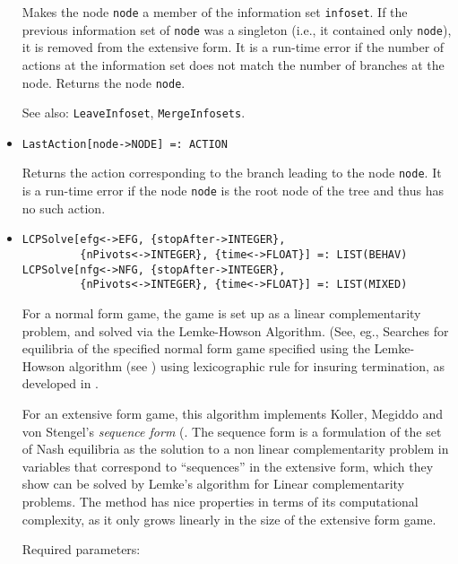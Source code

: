 \begin{itemize}
\bd
Makes the node \verb+node+ a member of the information set
\verb+infoset+.  If the previous information set of \verb+node+ was
a singleton (i.e., it contained only \verb+node+), it is removed from the
extensive form.  It is a run-time error if the number of actions at the
information set does not match the number of branches at the node.
Returns the node \verb+node+.
\item
[See also:] {\tt LeaveInfoset}, {\tt MergeInfosets}.
\ed



\item
\protect \large \begin{verbatim} 
LastAction[node->NODE] =: ACTION
\end{verbatim}\normalsize

\bd
Returns the action corresponding to the branch leading to
the node \verb+node+.  It is a run-time error if the node \verb+node+ is
the root node of the tree and thus has no such action.
\ed

\item
\protect \large \begin{verbatim}
LCPSolve[efg<->EFG, {stopAfter->INTEGER},
         {nPivots<->INTEGER}, {time<->FLOAT}] =: LIST(BEHAV)
LCPSolve[nfg<->NFG, {stopAfter->INTEGER},
         {nPivots<->INTEGER}, {time<->FLOAT}] =: LIST(MIXED)
\end{verbatim}\normalsize

\bd
For a normal form game, the game is set up as a linear
complementarity problem, and solved via the Lemke-Howson Algorithm.
(See, eg., Searches for equilibria of the specified normal form game
specified using the Lemke-Howson algorithm (see
\cite[1964]{LemHow:64}) using lexicographic rule for insuring
termination, as developed in \cite[1971]{Eav:71}.

For an extensive form game, this algorithm implements Koller, Megiddo
and von Stengel's {\em sequence form} (\cite[1994]{KolMegSte:94}. The
sequence form is a formulation of the set of Nash equilibria as the
solution to a non linear complementarity problem in variables that
correspond to ``sequences'' in the extensive form, which they show can
be solved by Lemke's algorithm for Linear complementarity problems.
The method has nice properties in terms of its computational
complexity, as it only grows linearly in the size of the extensive
form game.  

\item
[Required parameters:]\hfil\null


\end{itemize}
